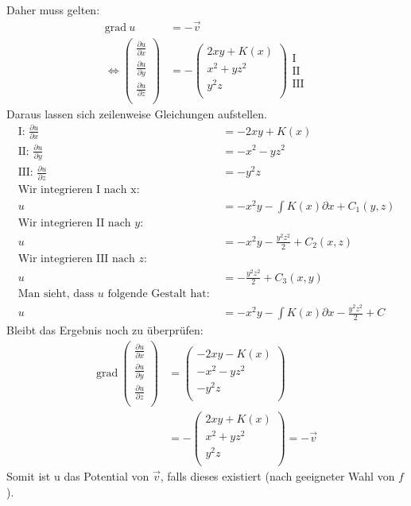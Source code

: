 \documentclass[10pt,a4paper,parskip=half]{scrartcl}
\newcommand{\vecthree}[3]{\begin{pmatrix}#1\\#2\\#3\\\end {pmatrix}}
\begin{document}
Daher muss gelten:
\begin{align*}
\text{grad}\ u &= - \vec v \\
\Leftrightarrow \vecthree{\frac{\partial u}{\partial x}}{\frac{\partial u}{\partial y}}{\frac{\partial u}{\partial z}} &= - \vecthree{2xy + K(x)}{x^2 + yz^2}{y^2z}\begin{array}{l} \text{I} \\ \text{II} \\ \text{III}\end{array}
\end{align*}
Daraus lassen sich zeilenweise Gleichungen aufstellen.
\begin{align*}
\text{I: }\frac{\partial u}{\partial x} &= - 2xy + K(x)\\
\text{II: }\frac{\partial u}{\partial y} &= -x^2 - yz^2\\
\text{III: }\frac{\partial u}{\partial z} &= -y^2z\\
\text{Wir integrieren I nach x: }&\\
u &= -x^2y - \int K(x) \partial x + C_1(y,z)\\
\text{Wir integrieren II nach $y$: }&\\
u &= -x^2y - \frac{y^2z^2}{2} + C_2(x,z)\\
\text{Wir integrieren III nach $z$: }&\\
u &= -\frac{y^2z^2}{2} + C_3(x,y)\\
\text{Man sieht, dass $u$ folgende Gestalt hat: }\\
u &= -x^2y - \int K(x) \partial x - \frac{y^2z^2}{2} + C
\end{align*}
Bleibt das Ergebnis noch zu überprüfen:
\begin{align*}
\text{grad}\ \vecthree{\frac{\partial u}{\partial x}}{\frac{\partial u}{\partial y}}{\frac{\partial u}{\partial z}} &= \vecthree{-2xy - K(x)}{-x^2-yz^2}{-y^2z}\\
&= -\vecthree{2xy + K(x)}{x^2+yz^2}{y^2z} = -\vec v
\end{align*}
Somit ist u das Potential von $\vec v$, falls dieses existiert (nach geeigneter Wahl von $f$).
\end{document}

